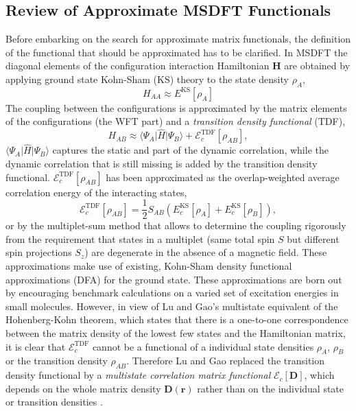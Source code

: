 \documentclass[journal=jpclcd,manuscript=letter]{achemso}
\newcommand\m[1]{\mathbf{#1}}
\renewcommand\vec[1]{\mathbf{#1}}
\begin{document}
\subsection{Review of Approximate MSDFT Functionals
\label{ref:review_transition_functional}
}
Before embarking on the search for approximate matrix functionals,
the definition of the functional that should be approximated has to be clarified.
In MSDFT\cite{Gao2016} the diagonal elements
of the configuration interaction Hamiltonian $\m{H}$ are obtained by applying ground state Kohn-Sham (KS) theory to the state density $\rho_A$,
\cite[Eqn.~(3)]{Grofe2017} \cite[Eqn.~(12)]{Zhu2023}
\begin{equation}
 H_{AA} \approx E^{\text{KS}}[\rho_A]
\end{equation}
The coupling between the configurations is approximated by the matrix elements of the configurations (the WFT part)
and a \emph{transition density functional} (TDF), \cite[Eqn.~(5)]{Grofe2017}
\begin{equation}
 H_{AB} \approx \langle \Psi_A \vert \hat{H} \vert \Psi_B \rangle + \mathcal{E}^{\text{TDF}}_c[\rho_{AB}],
\end{equation}
$\langle \Psi_A \vert \hat{H} \vert \Psi_B \rangle$ captures the static and part of the dynamic correlation,
while the dynamic correlation that is still missing is added by the transition density functional.
$\mathcal{E}^{\text{TDF}}_c[\rho_{AB}]$ has been
approximated as the overlap-weighted average correlation energy of the interacting states, \cite[Eqn.~(6)]{Gao2016}
\begin{equation}
  \mathcal{E}^{\text{TDF}}_c[\rho_{AB}] = \frac{1}{2} S_{AB} \left( E_c^{\text{KS}}[\rho_A] + E_c^{\text{KS}}[\rho_B] \right),
\end{equation}
or by the multiplet-sum method \cite{Ziegler1977,Grofe2017} that allows to determine the coupling rigorously from the requirement that
states in a multiplet (same total spin $S$ but different spin projections $S_z$) are degenerate in the absence of a magnetic field.
These approximations make use of existing, Kohn-Sham density functional approximations (DFA)
for the ground state. These approximations are born out by encouraging benchmark calculations \cite{Zhu2023} on a varied set
of excitation energies in small molecules. However, in view of Lu and Gao's multistate equivalent of the Hohenberg-Kohn theorem,
which states that there is a one-to-one correspondence between the matrix density of the lowest few states and the Hamiltonian matrix,
it is clear that $\mathcal{E}^{\text{TDF}}_c$ cannot be a functional of a individual state densities $\rho_A$, $\rho_B$
or the transition density $\rho_{AB}$. Therefore Lu and Gao
replaced the transition density functional by a \emph{multistate correlation matrix functional} $\mathcal{E}_{c}[\m{D}]$, which depends
on the whole matrix density $\m{D}(\vec{r})$ rather than on the individual state or transition densities \cite{Lu2022fundamental}.
\end{document}
